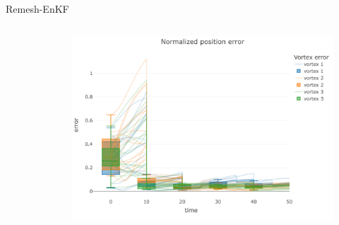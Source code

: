 \documentclass[aspectratio=169]{beamer} %
\begin{document}
\begin{frame}{Remesh-EnKF}
    \begin{columns}[t]
        \begin{column}{0.5\textwidth}
            \vspace{-0.5cm}
            \begin{figure}
                \centering
            \end{figure}
        \end{column}
        \begin{column}{0.5\textwidth}
            \begin{figure}
                \centering
                \includegraphics[width=\textwidth]{../../conference/images/remesh_enkf_error.pdf}
            \end{figure}
        \end{column}
    \end{columns}
\end{frame}
\end{document}
